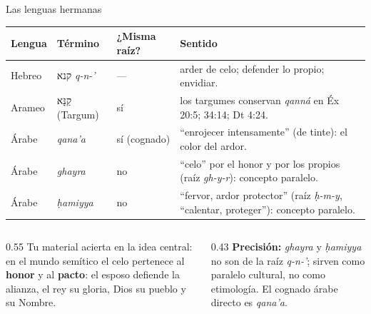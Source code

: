 \documentclass[hyperref={bookmarks=false},aspectratio=169]{beamer}
\newcommand{\heb}[1]{\mbox{\foreignlanguage{hebrew}{#1}}}
\newcommand{\destacar}[1]{\textbf{\textcolor{azul}{#1}}}
\newcommand{\precision}[1]{{\footnotesize\color{gris}\textbf{Precisión:} #1}}
\begin{document}
\begin{frame}{Las lenguas hermanas}
\scriptsize\renewcommand{\arraystretch}{1.18}
\begin{tabular}{@{}>{\RaggedRight\arraybackslash}p{1.5cm}>{\RaggedRight\arraybackslash}p{2.9cm}>{\RaggedRight\arraybackslash}p{2.0cm}>{\RaggedRight\arraybackslash}p{5.4cm}@{}}
\toprule
\textbf{Lengua} & \textbf{Término} & \textbf{¿Misma raíz?} & \textbf{Sentido} \\ \midrule
Hebreo & \heb{קנא} \emph{q-n-'} & --- & arder de celo; defender lo propio; envidiar. \\
Arameo & \heb{קַנָּא} (Targum) & sí & los targumes conservan \emph{qanná} en Éx 20:5; 34:14; Dt 4:24. \\
Árabe & \emph{qana'a} & sí (cognado) & ``enrojecer intensamente'' (de tinte): el color del ardor. \\
Árabe & \emph{ghayra} & no & ``celo'' por el honor y por los propios (raíz \emph{gh-y-r}): concepto paralelo. \\
Árabe & \emph{ḥamiyya} & no & ``fervor, ardor protector'' (raíz \emph{ḥ-m-y}, ``calentar, proteger''): concepto paralelo. \\
\bottomrule
\end{tabular}\par\medskip
\begin{columns}[t,onlytextwidth]
\begin{column}{0.55\textwidth}\small
Tu material acierta en la idea central: en el mundo semítico el celo pertenece al \destacar{honor} y al \destacar{pacto}: el esposo defiende la alianza, el rey su gloria, Dios su pueblo y su Nombre.
\end{column}
\begin{column}{0.43\textwidth}
\precision{\emph{ghayra} y \emph{ḥamiyya} no son de la raíz \emph{q-n-'}; sirven como paralelo cultural, no como etimología. El cognado árabe directo es \emph{qana'a}.}
\end{column}
\end{columns}
\end{frame}
\end{document}
